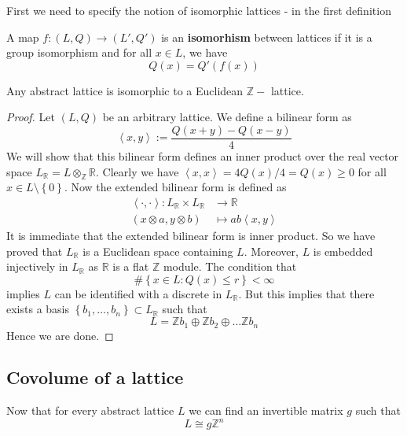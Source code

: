 First we need to specify the notion of isomorphic lattices - in the first definition
\begin{definition}
    A map $f \colon (L,Q)   \to (L',Q')$  is an \textbf{isomorhism} between lattices if it is a group isomorphism and
    for all $x \in L$, we have
    \[Q(x) = Q'(f(x)) \]
\end{definition}
\begin{prop}\label{equiv-def}
    Any abstract lattice is isomorphic to a Euclidean $\mathbb{Z}-$ lattice.
\end{prop}
\begin{proof}
    Let $(L,Q)$ be an arbitrary lattice. We define a bilinear form as
    \[ \left\langle x,y \right\rangle := \dfrac{Q(x+y)-Q(x-y)}{4}\]
    We will show that this bilinear form defines an inner product over the real vector space $L_\mathbb{R} = L \otimes_\mathbb{Z} \mathbb{R}$.
    Clearly we have $\left\langle x,x \right\rangle = 4Q(x)/4 = Q(x) \ge 0$ for all $x  \in L \setminus \left\lbrace 0 \right\rbrace$.
    Now the extended bilinear form is defined as
    \begin{align*}
        \left\langle \cdot,\cdot \right\rangle  \colon L_\mathbb{R} \times L_\mathbb{R} & \to      \mathbb{R}                      \\
        (x\otimes a, y \otimes b)                                                       & \mapsto  ab\left\langle x,y\right\rangle
    \end{align*}
    It is immediate that the extended bilinear form is inner product. So we have proved that
    $L_\mathbb{R}$ is a Euclidean space containing $L$. Moreover, $L$ is embedded injectively in $L_\mathbb{R}$
    as $\mathbb{R}$ is a flat $\mathbb{Z}$ module. The condition that
    \[ \# \left\lbrace x \in L: Q(x) \le r\right\rbrace < \infty\]
    implies $L$ can be identified with a discrete in $L_\mathbb{R}$. But this implies that there exists a basis
    $\left\lbrace b_1,\ldots,b_n\right\rbrace \subset L_\mathbb{R}$  such that
    \[L = \mathbb{Z}b_1\oplus \mathbb{Z}b_2\oplus \ldots \mathbb{Z}b_n\]
    Hence we are done.
\end{proof}
\subsection{Covolume of a lattice}
Now that for every abstract lattice $L$ we can find an invertible matrix $g$ such that
\[ L  \cong g\mathbb{Z}^n\]


